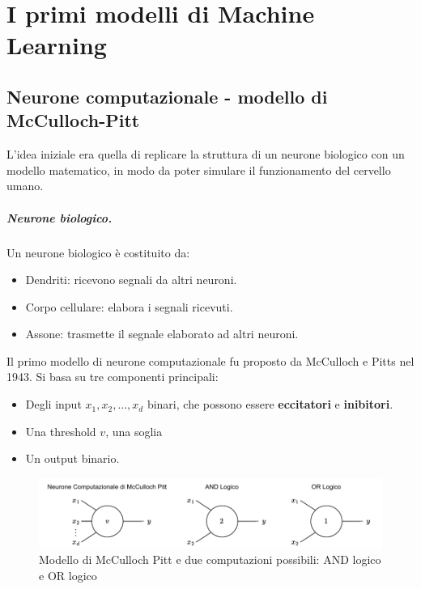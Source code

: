 \chapter{I primi modelli di Machine Learning}

\section{Neurone computazionale - modello di McCulloch-Pitt}
L'idea iniziale era quella di replicare la struttura di un neurone biologico con un modello matematico, in modo da poter simulare il funzionamento del cervello umano. 

\paragraph{Neurone biologico.} Un neurone biologico è costituito da:
\begin{itemize}
	\item Dendriti: ricevono segnali da altri neuroni.
	\item Corpo cellulare: elabora i segnali ricevuti.
	\item Assone: trasmette il segnale elaborato ad altri neuroni.
\end{itemize}

\noindent
Il primo modello di neurone computazionale fu proposto da McCulloch e Pitts nel 1943. Si basa su tre componenti principali: 

\begin{itemize}
	\item Degli input $x_1, x_2, \dots, x_d$ binari, che possono essere \textbf{eccitatori }e \textbf{inibitori}. 
	\item Una threshold $v$, una soglia
	\item Un output binario.
\end{itemize}

\begin{figure}[tbph]
	\centering
	\includegraphics[width=\linewidth]{./images/neurone_computazionale.pdf}
	\caption{Modello di McCulloch Pitt e due computazioni possibili: AND logico e OR logico}
	\label{fig:neuronecomputazionale}
\end{figure}

